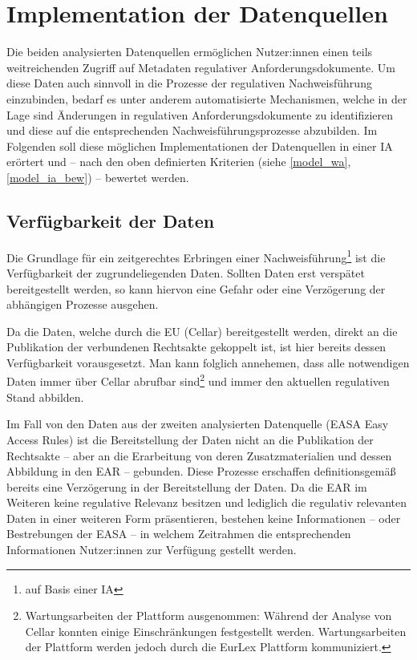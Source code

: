 
\chapter{Implementation der Datenquellen} \label{anal}

    Die beiden analysierten Datenquellen ermöglichen Nutzer:innen einen teils weitreichenden Zugriff auf Metadaten regulativer Anforderungsdokumente.
    Um diese Daten auch sinnvoll in die Prozesse der regulativen Nachweisführung einzubinden, bedarf es unter anderem automatisierte Mechanismen, welche in der Lage sind Änderungen in regulativen Anforderungsdokumente zu identifizieren und diese auf die entsprechenden Nachweisführungsprozesse abzubilden.
    Im Folgenden soll diese möglichen Implementationen der Datenquellen in einer \acf{IA} erörtert und -- nach den oben definierten Kriterien (siehe \ref{model_wa}, \ref{model_ia_bew}) -- bewertet werden.

\section{Verfügbarkeit der Daten}

    Die Grundlage für ein zeitgerechtes Erbringen einer Nachweisführung\footnote{auf Basis einer \ac{IA}} ist die Verfügbarkeit der zugrundeliegenden Daten.
    Sollten Daten erst verspätet bereitgestellt werden, so kann hiervon eine Gefahr oder eine Verzögerung der abhängigen Prozesse ausgehen.

    \medskip
    Da die Daten, welche durch die \ac{EU} (Cellar) bereitgestellt werden, direkt an die Publikation der verbundenen Rechtsakte gekoppelt ist, ist hier bereits dessen Verfügbarkeit vorausgesetzt.
    Man kann folglich annehemen, dass alle notwendigen Daten immer über Cellar abrufbar sind\footnote{Wartungsarbeiten der Plattform ausgenommen: Während der Analyse von Cellar konnten einige Einschränkungen festgestellt werden. Wartungsarbeiten der Plattform werden jedoch durch die EurLex Plattform kommuniziert.} und immer den aktuellen regulativen Stand abbilden.

    \medskip
    Im Fall von den Daten aus der zweiten analysierten Datenquelle (\ac{EASA} Easy Access Rules) ist die Bereitstellung der Daten nicht an die Publikation der Rechtsakte -- aber an die Erarbeitung von deren Zusatzmaterialien und dessen Abbildung in den \ac{EAR} -- gebunden.
    Diese Prozesse erschaffen definitionsgemäß bereits eine Verzögerung in der Bereitstellung der Daten.
    Da die \ac{EAR} im Weiteren keine regulative Relevanz besitzen und lediglich die regulativ relevanten Daten in einer weiteren Form präsentieren, bestehen keine Informationen -- oder Bestrebungen der \ac{EASA} \cite{easa_xml_export} -- in welchem Zeitrahmen die entsprechenden Informationen Nutzer:innen zur Verfügung gestellt werden.    

